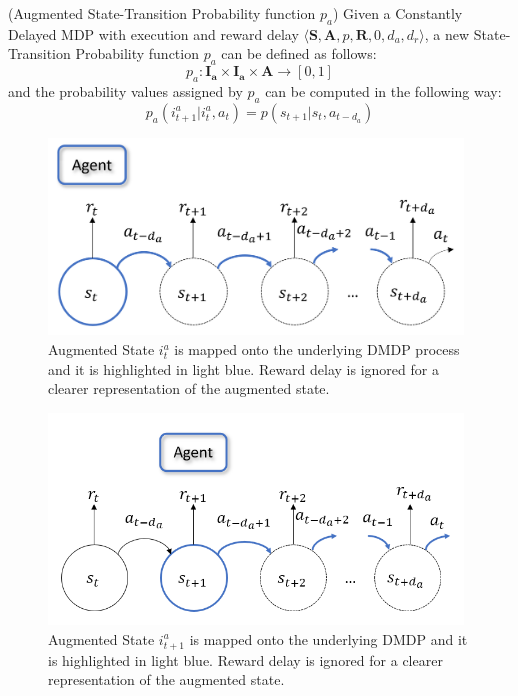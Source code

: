                 \begin{definition}(Augmented State-Transition Probability function $p_a$)
                    \label{def:execaugmenttrans}
                    Given a Constantly Delayed MDP with execution and reward delay $\langle \mathbf{S}, \mathbf{A}, p, \mathbf{R}, 0, d_a, d_r \rangle$,
                    a new State-Transition Probability function $p_a$ can be defined as follows:
                    \[ p_a :  \mathbf{I_{a}} \times \mathbf{I_{a}} \times \mathbf{A} \rightarrow [0, 1]\]
                    and the probability values assigned by $p_a$ can be computed in the following way:
                    \[ p_a \left( i_{t+1}^a | i_t^a , a_t  \right) = p ( s_{t+1} | s_t, a_{t-d_{a}} ) \]
                \end{definition}
                \begin{figure}[t]
                    \centering
                    \includegraphics[width=11cm, keepaspectratio]{images/dmdp/augmented_i_a.png}
                    \caption{Augmented State $i_t^a$ is mapped onto the underlying DMDP process and it is highlighted in light blue. Reward delay is ignored for a clearer representation of the augmented state.}
                    \label{fig:augmented_i_a}
                \end{figure}
                \begin{figure}[t]
                    \centering
                    \includegraphics[width=11cm, keepaspectratio]{images/dmdp/augmented_i_a_next.png}
                    \caption{Augmented State $i_{t+1}^a$ is mapped onto the underlying DMDP and it is highlighted in light blue. Reward delay is ignored for a clearer representation of the augmented state.}
                    \label{fig:augmented_i_a_next}
                \end{figure}
